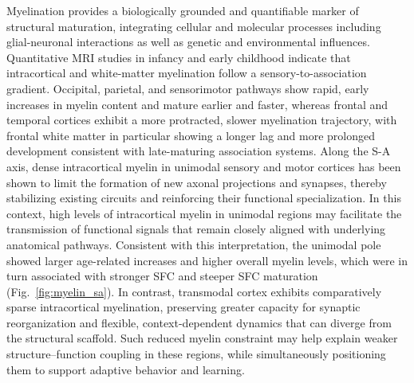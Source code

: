 Myelination provides a biologically grounded and quantifiable marker of structural maturation, integrating cellular and molecular processes including glial-neuronal interactions as well as genetic and environmental influences\cite{naveMyelinationSupportAxonal2010,hughesGlialCellsPromote2021}. Quantitative MRI studies in infancy and early childhood indicate that intracortical and white-matter myelination follow a sensory-to-association gradient. Occipital, parietal, and sensorimotor pathways show rapid, early increases in myelin content and mature earlier and faster, whereas frontal and temporal cortices exhibit a more protracted, slower myelination trajectory, with frontal white matter in particular showing a longer lag and more prolonged development consistent with late-maturing association systems\cite{deoniCorticalMaturationMyelination2015a,yuInitialMyelinationCentral2023}.
Along the S-A axis, dense intracortical myelin in unimodal sensory and motor cortices has been shown to limit the formation of new axonal projections and synapses, thereby stabilizing existing circuits and reinforcing their functional specialization\cite{deoniCorticalMaturationMyelination2015a,millerProlongedMyelinationHuman2012,FaccaMultiscale2024}. In this context, high levels of intracortical myelin in unimodal regions may facilitate the transmission of functional signals that remain closely aligned with underlying anatomical pathways. Consistent with this interpretation, the unimodal pole showed larger age-related increases and higher overall myelin levels, which were in turn associated with stronger SFC and steeper SFC maturation (Fig.~\ref{fig:myelin_sa}). In contrast, transmodal cortex exhibits comparatively sparse intracortical myelination, preserving greater capacity for synaptic reorganization and flexible, context-dependent dynamics that can diverge from the structural scaffold. Such reduced myelin constraint may help explain weaker structure–function coupling in these regions, while simultaneously positioning them to support adaptive behavior and learning.


